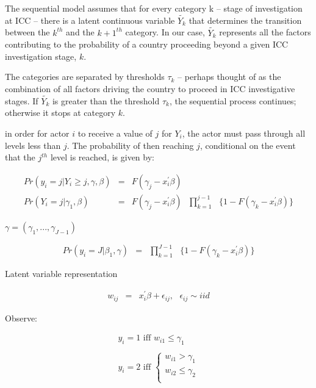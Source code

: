 The sequential model assumes that for every category k -- stage of investigation at ICC -- there is a latent continuous variable $\tilde{Y_{k}}$ that determines the transition between the $k^{th}$ and the $k+1^{th}$ category. In our case, $\tilde{Y_{k}}$ represents all the factors contributing to the probability of a country proceeding beyond a given ICC investigation stage, $k$.


The categories are separated by thresholds $\tau_{k}$ -- perhaps thought of as the combination of all factors driving the country to proceed in ICC investigative stages. If $\tilde{Y_{k}}$ is greater than the threshold $\tau_{k}$, the sequential process continues; otherwise it stops at category $k$.

in order for actor $i$ to receive a value of $j$ for $Y_{i}$, the actor must pass through all levels less than $j$. The probability of then reaching $j$, conditional on the event that the $j^{th}$ level is reached, is given by:

\begin{eqnarray}
	Pr(y_{i}={j} | Y_{i} \geq {j}, \gamma, \beta) &=& F(\gamma_{j} - x_{i}^{'}\beta) \nonumber \\
	Pr(Y_{i}={j}|\gamma_{1},\beta) &=& F(\gamma_{j} - x_{i}^{'}\beta)\text{ }\prod^{j-1}_{k=1}\text{ }\{1-F(\gamma_{k}-x_{i}^{'}\beta)\} \nonumber
\end{eqnarray}

$\gamma = (\gamma_{1},...,\gamma_{J-1})$

\begin{eqnarray}
	Pr(y_{i}=J|\beta_{1},\gamma) &=&\text{}\prod^{J-1}_{k=1}\text{ }\{1-F(\gamma_{k}-x_{i}^{'}\beta)\} \nonumber
\end{eqnarray}

Latent variable representation

\begin{eqnarray}
	w_{ij} &=& x_{i}^{'}\beta+\epsilon_{ij},\text{ }\epsilon_{ij} \sim iid \nonumber
\end{eqnarray}

Observe:

\begin{eqnarray}
	y_{i} = 1\text{ iff } w_{i1} \leq \gamma_{1} \nonumber \\
	\nonumber \\
	y_{i} = 2\text{ iff }
	\begin{cases}
	w_{i1} > \gamma_{1} \nonumber \\
	w_{i2} \leq \gamma_{2} \nonumber \\
\end{cases}
\end{eqnarray}

